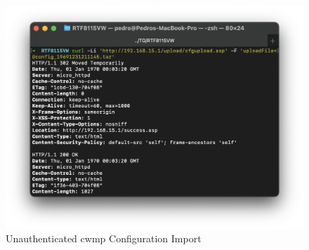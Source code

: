 \begin{figure}[h]
    \centering
    \includegraphics[width=\linewidth]{contents/http-management-interface-analysis/unauthenticated-routes/unauthenticated-cpe-configuration-import.png}
    \caption{Unauthenticated \gls{cwmp} Configuration Import}
    \label{figure:unauthenticated_cpe_configuration_import}
\end{figure}

\FloatBarrier
